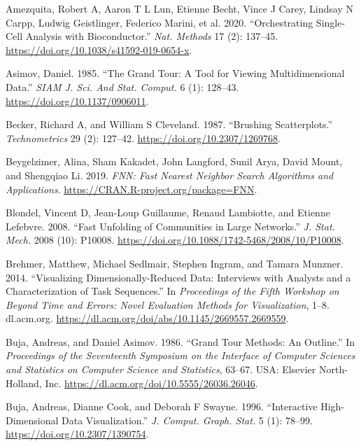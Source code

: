 \documentclass[article,notitle]{jdssv}
\begin{document}
\hypertarget{refs}{}
\leavevmode\hypertarget{ref-Amezquita2020-at}{}%
Amezquita, Robert A, Aaron T L Lun, Etienne Becht, Vince J Carey, Lindsay N Carpp, Ludwig Geistlinger, Federico Marini, et al. 2020. ``Orchestrating Single-Cell Analysis with Bioconductor.'' \emph{Nat. Methods} 17 (2): 137--45. \url{https://doi.org/10.1038/s41592-019-0654-x}.

\leavevmode\hypertarget{ref-Asimov1985-vp}{}%
Asimov, Daniel. 1985. ``The Grand Tour: A Tool for Viewing Multidimensional Data.'' \emph{SIAM J. Sci. And Stat. Comput.} 6 (1): 128--43. \url{https://doi.org/10.1137/0906011}.

\leavevmode\hypertarget{ref-Becker1987-gd}{}%
Becker, Richard A, and William S Cleveland. 1987. ``Brushing Scatterplots.'' \emph{Technometrics} 29 (2): 127--42. \url{https://doi.org/10.2307/1269768}.

\leavevmode\hypertarget{ref-fnn-pkg}{}%
Beygelzimer, Alina, Sham Kakadet, John Langford, Sunil Arya, David Mount, and Shengqiao Li. 2019. \emph{FNN: Fast Nearest Neighbor Search Algorithms and Applications}. \url{https://CRAN.R-project.org/package=FNN}.

\leavevmode\hypertarget{ref-Blondel2008-bx}{}%
Blondel, Vincent D, Jean-Loup Guillaume, Renaud Lambiotte, and Etienne Lefebvre. 2008. ``Fast Unfolding of Communities in Large Networks.'' \emph{J. Stat. Mech.} 2008 (10): P10008. \url{https://doi.org/10.1088/1742-5468/2008/10/P10008}.

\leavevmode\hypertarget{ref-Brehmer2014-hk}{}%
Brehmer, Matthew, Michael Sedlmair, Stephen Ingram, and Tamara Munzner. 2014. ``Visualizing Dimensionally-Reduced Data: Interviews with Analysts and a Characterization of Task Sequences.'' In \emph{Proceedings of the Fifth Workshop on Beyond Time and Errors: Novel Evaluation Methods for Visualization}, 1--8. dl.acm.org. \url{https://dl.acm.org/doi/abs/10.1145/2669557.2669559}.

\leavevmode\hypertarget{ref-Buja1986-zr}{}%
Buja, Andreas, and Daniel Asimov. 1986. ``Grand Tour Methods: An Outline.'' In \emph{Proceedings of the Seventeenth Symposium on the Interface of Computer Sciences and Statistics on Computer Science and Statistics}, 63--67. USA: Elsevier North-Holland, Inc. \url{https://dl.acm.org/doi/10.5555/26036.26046}.

\leavevmode\hypertarget{ref-Buja1996-fk}{}%
Buja, Andreas, Dianne Cook, and Deborah F Swayne. 1996. ``Interactive High-Dimensional Data Visualization.'' \emph{J. Comput. Graph. Stat.} 5 (1): 78--99. \url{https://doi.org/10.2307/1390754}.
\end{document}
